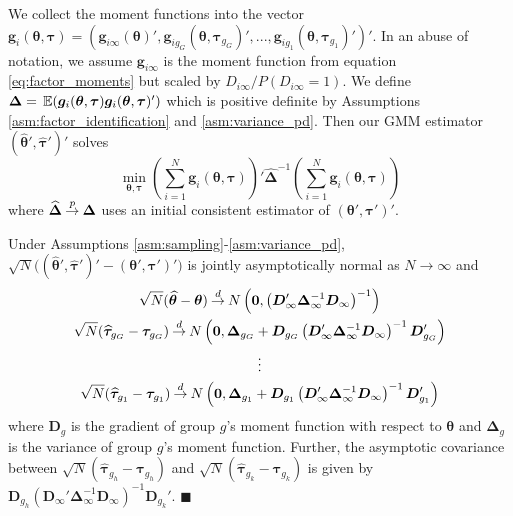 \documentclass[12pt]{article}
\begin{document}
We collect the moment functions into the vector $\bm g_i(\bm{\theta}, \bm \tau) = (\bm g_{i\infty}(\bm{\theta})', \bm g_{ig_G}(\bm{\theta}, \bm \tau_{g_G})',...,\bm g_{ig_1}(\bm{\theta}, \bm \tau_{g_1})')'$. In an abuse of notation, we assume $\bm g_{i\infty}$ is the moment function from equation \eqref{eq:factor_moments} but scaled by $D_{i\infty} / P(D_{i \infty} = 1)$. We define $\bm \Delta = \expec{\bm g_i(\bm{\theta}, \bm \tau) \bm g_i(\bm{\theta}, \bm \tau)'}$ which is positive definite by Assumptions \ref{asm:factor_identification} and \ref{asm:variance_pd}. Then our GMM estimator $(\widehat{ \bm{\theta}}', \widehat{ \bm \tau}')'$ solves
\begin{equation}\label{eq:minimization_problem}
  \min_{\bm{\theta}, \bm \tau} \left( \sum_{i = 1}^N \bm g_i(\bm{\theta}, \bm \tau) \right)' \widehat{\bm \Delta}^{-1} \left( \sum_{i = 1}^N \bm g_i(\bm{\theta}, \bm \tau) \right)
\end{equation}
where $\widehat{\bm \Delta} \mathbin{\overset{p}{\to}} \bm \Delta$ uses an initial consistent estimator of $(\bm{\theta}', \bm \tau')'$. 

\begin{theorem}\label{theorem:asymptotic_distribution}
  Under Assumptions \ref{asm:sampling}-\ref{asm:variance_pd}, $\sqrt{N}\big((\widehat{\bm{\theta}}', \widehat{\bm \tau}')' - (\bm{\theta}', \bm \tau')'\big)$ is jointly asymptotically normal as $N \rightarrow \infty$ and
  \begin{gather*}
    \sqrt{N}(\widehat{\bm{\theta}} - \bm{\theta}) \mathbin{\overset{d}{\to}} N \left( \bm 0, \left( \bm D'_{\infty} \bm \Delta_{\infty}^{-1} \bm D_{\infty} \right)^{-1} \right) \\
    \sqrt{N}(\widehat{\bm \tau}_{g_G} - \bm \tau_{g_G}) \mathbin{\overset{d}{\to}} N \left( \bm 0, \bm \Delta_{g_G} + \bm D_{g_G} \left( \bm D'_{\infty} \bm \Delta_{\infty}^{-1} \bm D_{\infty} \right)^{-1} \bm D_{g_G}'  \right)\\
    \vdots\\
    \sqrt{N}(\widehat{\bm \tau}_{g_1} - \bm \tau_{g_1}) \mathbin{\overset{d}{\to}} N \left( \bm 0, \bm \Delta_{g_1} + \bm D_{g_1} \left( \bm D'_{\infty} \bm \Delta_{\infty}^{-1} \bm D_{\infty} \right)^{-1} \bm D_{g_1}' \right)
  \end{gather*}
where $\bm D_g$ is the gradient of group $g$'s moment function with respect to $\bm{\theta}$ and $\bm \Delta_g$ is the variance of group $g$'s moment function. Further, the asymptotic covariance between $\sqrt{N}(\widehat{\bm \tau}_{g_h} - \bm \tau_{g_h})$ and $\sqrt{N}(\widehat{\bm \tau}_{g_k} - \bm \tau_{g_k})$ is given by $\bm D_{g_h} (\bm D_{\infty}' \bm \Delta_{\infty}^{-1} \bm D_{\infty})^{-1} \bm D_{g_k}'$. $\blacksquare$
\end{theorem}
\end{document}
